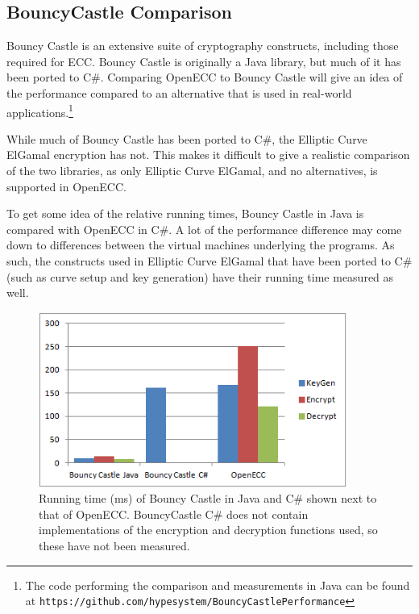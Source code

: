 \subsection{BouncyCastle Comparison}
\label{sec:performance_bouncycastle}

Bouncy Castle is an extensive suite of cryptography constructs, including those required for ECC. Bouncy Castle is originally a
Java library, but much of it has been ported to C\#. Comparing OpenECC to Bouncy Castle will give an idea of the performance
compared to an alternative that is used in real-world applications.\footnote{The code performing the comparison and measurements
in Java can be found at \texttt{https://github.com/hypesystem/BouncyCastlePerformance}}

While much of Bouncy Castle has been ported to C\#, the Elliptic Curve ElGamal encryption has not. This makes it difficult to
give a realistic comparison of the two libraries, as only Elliptic Curve ElGamal, and no alternatives, is supported in OpenECC.

To get some idea of the relative running times, Bouncy Castle in Java is compared with OpenECC in C\#. A lot of the performance
difference may come down to differences between the virtual machines underlying the programs. As such, the constructs used in
Elliptic Curve ElGamal that have been ported to C\# (such as curve setup and key generation) have their running time measured
as well.

\begin{figure}[htb!]
	\centering
	\includegraphics[width=0.9\textwidth]{performance/bouncycastle-comparison}
	\caption{Running time (ms) of Bouncy Castle in Java and C\# shown next to that of OpenECC. BouncyCastle C\# does not contain
		implementations of the encryption and decryption functions used, so these have not been measured.}
	\label{fig:bouncycastle-comparison-graph}
\end{figure}

